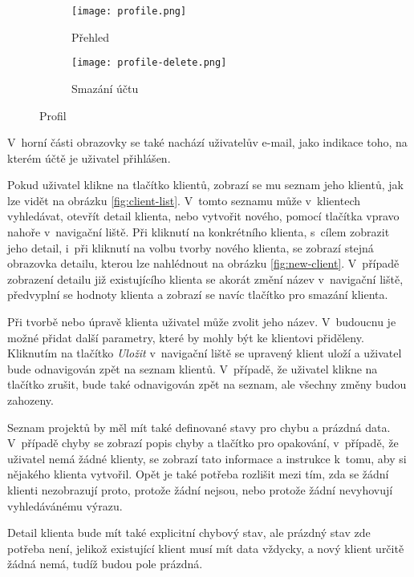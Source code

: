 \begin{figure}[h]
    \centering
    \begin{subfigure}[b]{0.4\textwidth}
		\centering
		\texttt{[image: profile.png]}
		\caption{Přehled}
		\label{fig:profile-overview}
	\end{subfigure}
	\hspace{2cm}
	\begin{subfigure}[b]{0.4\textwidth}
		\centering
		\texttt{[image: profile-delete.png]}
		\caption{Smazání účtu}
		\label{fig:profile-delete}
	\end{subfigure}
	\caption{Profil}
	\label{fig:profile}
\end{figure}

V~horní části obrazovky se také nachází uživatelův e-mail, jako indikace toho, na kterém účtě je uživatel přihlášen.

Pokud uživatel klikne na tlačítko klientů, zobrazí se mu seznam jeho klientů, jak lze vidět na obrázku \ref{fig:client-list}. V~tomto seznamu může v~klientech vyhledávat, otevřít detail klienta, nebo vytvořit nového, pomocí tlačítka vpravo nahoře v~navigační liště. Při kliknutí na konkrétního klienta, s~cílem zobrazit jeho detail, i~při kliknutí na volbu tvorby nového klienta, se zobrazí stejná obrazovka detailu, kterou lze nahlédnout na obrázku \ref{fig:new-client}. V~případě zobrazení detailu již existujícího klienta se akorát změní název v~navigační liště, předvyplní se hodnoty klienta a zobrazí se navíc tlačítko pro smazání klienta.

Při tvorbě nebo úpravě klienta uživatel může zvolit jeho název. V~budoucnu je možné přidat další parametry, které by mohly být ke klientovi přiděleny. Kliknutím na tlačítko \emph{Uložit} v~navigační liště se upravený klient uloží a uživatel bude odnavigován zpět na seznam klientů. V~případě, že uživatel klikne na tlačítko zrušit, bude také odnavigován zpět na seznam, ale všechny změny budou zahozeny.

Seznam projektů by měl mít také definované stavy pro chybu a prázdná data. V~případě chyby se zobrazí popis chyby a tlačítko pro opakování, v~případě, že uživatel nemá žádné klienty, se zobrazí tato informace a instrukce k~tomu, aby si nějakého klienta vytvořil. Opět je také potřeba rozlišit mezi tím, zda se žádní klienti nezobrazují proto, protože žádní nejsou, nebo protože žádní nevyhovují vyhledávánému výrazu.

Detail klienta bude mít také explicitní chybový stav, ale prázdný stav zde potřeba není, jelikož existující klient musí mít data vždycky, a nový klient určitě žádná nemá, tudíž budou pole prázdná.

